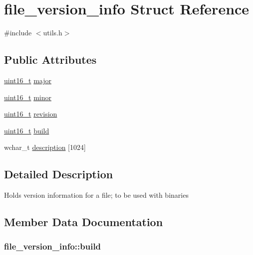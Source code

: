 \section{file\-\_\-version\-\_\-info Struct Reference}
\label{structfile__version__info}


{\ttfamily \#include $<$utils.\-h$>$}

\subsection*{Public Attributes}
\begin{DoxyCompactItemize}
\item 
\hyperlink{stdint_8h_a273cf69d639a59973b6019625df33e30}{uint16\-\_\-t} \hyperlink{structfile__version__info_a2c47d9700d7fda5a2173073d81b407b9}{major}
\item 
\hyperlink{stdint_8h_a273cf69d639a59973b6019625df33e30}{uint16\-\_\-t} \hyperlink{structfile__version__info_a424cd590bddb5325a217cd475c82d555}{minor}
\item 
\hyperlink{stdint_8h_a273cf69d639a59973b6019625df33e30}{uint16\-\_\-t} \hyperlink{structfile__version__info_aef9bfeea912db00d1980991a4f959a5a}{revision}
\item 
\hyperlink{stdint_8h_a273cf69d639a59973b6019625df33e30}{uint16\-\_\-t} \hyperlink{structfile__version__info_adbf53d64c60b23d86989ae75368e0155}{build}
\item 
wchar\-\_\-t \hyperlink{structfile__version__info_a1e09e5f632f3c0788a9db6f697b2557f}{description} \mbox{[}1024\mbox{]}
\end{DoxyCompactItemize}


\subsection{Detailed Description}
Holds version information for a file; to be used with binaries 

\subsection{Member Data Documentation}
\subsubsection[{build}]{ file\-\_\-version\-\_\-info\-::build}\label{structfile__version__info_adbf53d64c60b23d86989ae75368e0155}
